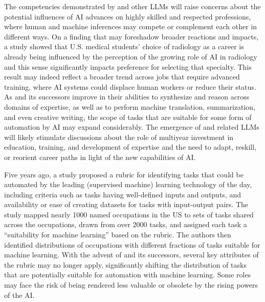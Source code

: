 The competencies demonstrated by {\DV} and other LLMs will raise concerns about the potential influences of AI advances on highly skilled and respected professions, where human and machine inferences may compete or complement each other in different ways. On a finding that may foreshadow broader reactions and impacts, a study \cite{Reeder2022} showed that U.S. medical students' choice of radiology as a career is already being influenced by the perception of the growing role of AI in radiology and this sense significantly impacts preference for selecting that specialty. This result may indeed reflect a broader trend across jobs that require advanced training, where AI systems could displace human workers or reduce their status. As {\DV} and its successors improve in their abilities to synthesize and reason across domains of expertise, as well as to perform machine translation, summarization, and even creative writing, the scope of tasks that are suitable for some form of automation by AI may expand considerably.  The emergence of {\DV} and related LLMs will likely stimulate discussions about the role of multiyear investment in education, training, and development of expertise and the need to adapt, reskill, or reorient career paths in light of the new capabilities of AI. 

Five years ago, a study \cite{brynjolfsson2017} proposed a rubric for identifying tasks that could be automated by the leading (supervised machine) learning technology of the day, including criteria such as tasks having well-defined inputs and outputs, and availability or ease of creating datasets for tasks with input-output pairs. The study mapped nearly 1000 named occupations in the US to sets of tasks shared across the occupations, drawn from over 2000 tasks, and assigned each task a ``suitability for machine learning'' based on the rubric. The authors then identified distributions of occupations with different fractions of tasks suitable for machine learning. With the advent of {\DV} and its successors, several key attributes of the rubric may no longer apply, significantly shifting the distribution of tasks that are potentially suitable for automation with machine learning. Some roles may face the risk of being rendered less valuable or obsolete by the rising powers of the AI. 

